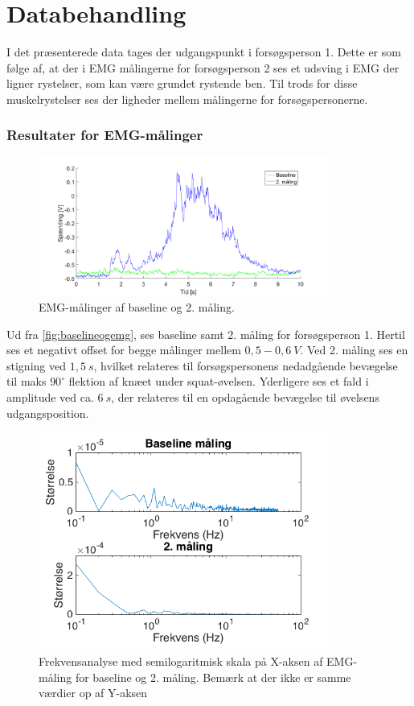 \section{Databehandling}
I det præsenterede data tages der udgangspunkt i forsøgsperson 1. Dette er som følge af, at der i EMG målingerne for forsøgsperson 2 ses et udsving i EMG der ligner rystelser, som kan være grundet rystende ben. Til trods for disse muskelrystelser ses der ligheder mellem målingerne for forsøgspersonerne. 

\subsubsection{Resultater for EMG-målinger}

\begin{figure}[H]
	\centering
	\includegraphics[width=0.85\textwidth]{figures/Pilotforsoeg/baselineogemg.png}
	\caption{EMG-målinger af baseline og 2. måling.}
	\label{fig:baselineogemg}
\end{figure}
Ud fra \autoref{fig:baselineogemg}, ses baseline samt 2. måling for forsøgsperson 1. Hertil ses et negativt offset for begge målinger mellem $0,5-0,6~V$. Ved 2. måling ses en stigning ved $1,5~s$, hvilket relateres til forsøgspersonens nedadgående bevægelse til maks $90^{\circ}$ flektion af knæet under squat-øvelsen. Yderligere ses et fald i amplitude ved ca. $6~s$, der relateres til en opdagående bevægelse til øvelsens udgangsposition. 


\begin{figure}[H]
	\centering
	\includegraphics[width=0.85\textwidth]{figures/Pilotforsoeg/emgfft.png}
	\caption{Frekvensanalyse med semilogaritmisk skala på X-aksen af EMG-måling for baseline og 2. måling. Bemærk at der ikke er samme værdier op af Y-aksen}
	\label{fig:emgfft}
\end{figure}

